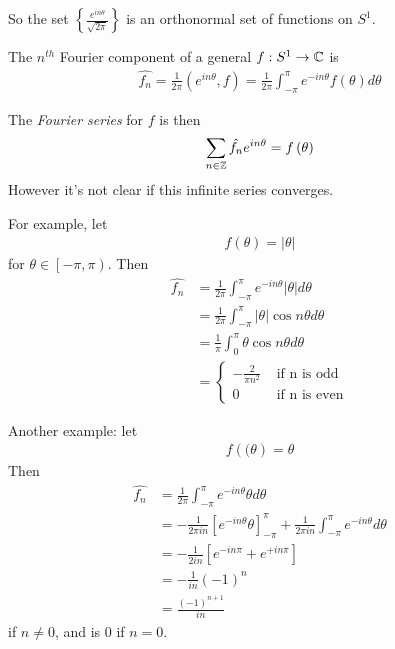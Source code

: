\documentclass[a4paper]{article}
\begin{document}
So the set $\left\{\frac{e^{in\theta}}{\sqrt{2\pi}}\right\}$ is an orthonormal set of functions on $S^1$.

The $n^{th}$ Fourier component of a general $f:S^1 \to \mathbb{C}$ is
\begin{equation*}
\begin{aligned}
\hat{f_n} = \frac{1}{2\pi} \left(e^{in\theta},f\right) = \frac{1}{2\pi}\int_{-\pi}^\pi e^{-in\theta} f\left(\theta\right) d\theta
\end{aligned}
\end{equation*}

The \emph{Fourier series} for $f$ is then
\begin{equation*}
\begin{aligned}
\sum_{n\in\mathbb{Z}} \hat{f_n} e^{in\theta} = f\left(\theta\right)
\end{aligned}
\end{equation*}
However it's not clear if this infinite series converges.

For example, let
\begin{equation*}
\begin{aligned}
f\left(\theta\right) = |\theta|
\end{aligned}
\end{equation*}
for $\theta\in\left[-\pi,\pi\right)$. Then
\begin{equation*}
\begin{aligned}
\hat{f_n} &= \frac{1}{2\pi}\int_{-\pi}^\pi e^{-in\theta} |\theta| d\theta \\&= \frac{1}{2\pi} \int_{-\pi}^\pi |\theta| \cos n\theta d\theta \\&= \frac{1}{\pi} \int_0^\pi \theta \cos n\theta d\theta \\&=
\left\{
\begin{array}{ll}
-\frac{2}{\pi n^2} & \text{ if n is odd}\\
0 & \text{ if n is even}
\end{array}
\right.
\end{aligned}
\end{equation*}

Another example: let 
\begin{equation*}
\begin{aligned}
f\left((\theta\right) = \theta
\end{aligned}
\end{equation*}
Then
\begin{equation*}
\begin{aligned}
\hat{f_n} &= \frac{1}{2\pi}\int_{-\pi}^\pi e^{-in\theta} \theta d\theta \\&= -\frac{1}{2\pi in}\left[e^{-in\theta} \theta\right]_{-\pi}^\pi + \frac{1}{2\pi in} \int_{-\pi}^\pi e^{-in\theta}d\theta \\&= -\frac{1}{2in}\left[e^{-in\pi} + e^{+in\pi}\right] \\&=-\frac{1}{in}\left(-1\right)^n \\&=\frac{\left(-1\right)^{n+1}}{in}
\end{aligned}
\end{equation*}
if $n\neq 0$, and is $0$ if $n=0$.
\end{document}
